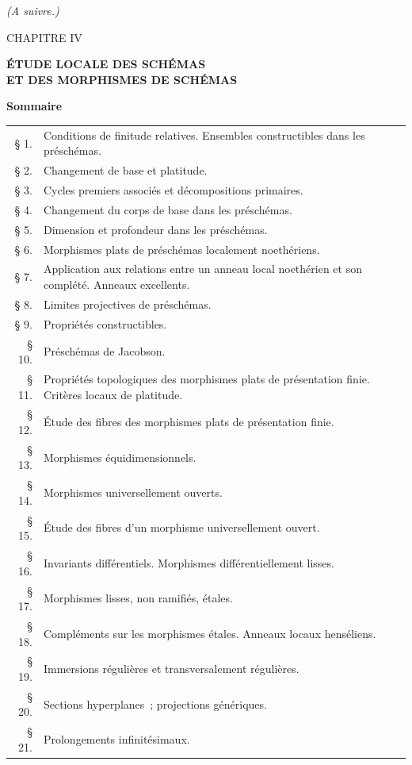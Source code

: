 \documentclass[10pt,oneside]{book}
\newcommand{\oldpage}[2][]{%
  \setcounter{footnote}{0}%
  \marginpar{\scriptsize\textbf{#1}~|~#2}\ignorespaces}
\begin{document}
\begin{flushright}
\emph{(A suivre.)}
\end{flushright}


%
\cleardoublepage
{}
\oldpage[IV-1]{222}
\thispagestyle{plain}

\begin{center}
{\Large CHAPITRE IV}

\vspace{1.5cm}
{\LARGE\bfseries ÉTUDE LOCALE DES SCHÉMAS\\[0.3em]
ET DES MORPHISMES DE SCHÉMAS}

\vspace{1.5cm}
{\large\bfseries Sommaire}
\end{center}

\medskip
\begin{tabular}{@{}r p{}}
§ 1. & Conditions de finitude relatives. Ensembles constructibles dans les préschémas.\\
§ 2. & Changement de base et platitude.\\
§ 3. & Cycles premiers associés et décompositions primaires.\\
§ 4. & Changement du corps de base dans les préschémas.\\
§ 5. & Dimension et profondeur dans les préschémas.\\
§ 6. & Morphismes plats de préschémas localement noethériens.\\
§ 7. & Application aux relations entre un anneau local noethérien et son complété.
Anneaux excellents.\\
§ 8. & Limites projectives de préschémas.\\
§ 9. & Propriétés constructibles.\\
§ 10. & Préschémas de Jacobson.\\
§ 11.\footnotemark[1] & Propriétés topologiques des morphismes plats de présentation finie.
Critères locaux de platitude.\\
§ 12. & Étude des fibres des morphismes plats de présentation finie.\\
§ 13. & Morphismes équidimensionnels.\\
§ 14. & Morphismes universellement ouverts.\\
§ 15. & Étude des fibres d'un morphisme universellement ouvert.\\
§ 16. & Invariants différentiels. Morphismes différentiellement lisses.\\
§ 17. & Morphismes lisses, non ramifiés, étales.\\
§ 18. & Compléments sur les morphismes étales. Anneaux locaux henséliens.\\
§ 19. & Immersions régulières et transversalement régulières.\\
§ 20. & Sections hyperplanes~; projections génériques.\\
§ 21. & Prolongements infinitésimaux.\\
\end{tabular}
\end{document}
